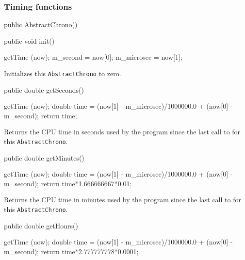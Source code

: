 \subsubsection*{Timing functions}

\begin{code}
   public AbstractChrono()\begin{hide} {
   }\end{hide}


   public void init() \begin{hide} {
      getTime (now);
      m_second = now[0];
      m_microsec = now[1];
   }\end{hide}
\end{code}
  \begin{tabb}  Initializes this \texttt{AbstractChrono} to zero.
  \end{tabb}
\begin{code}

   public double getSeconds()\begin{hide} {
      getTime (now);
      double time = (now[1] - m_microsec)/1000000.0
             + (now[0] - m_second);
      return time;
   }\end{hide}
\end{code}
 \begin{tabb}
  Returns the CPU time in seconds used by the program since the last call to
   for this \texttt{AbstractChrono}.
 \end{tabb}
\begin{htmlonly}
\end{htmlonly}
\begin{code}

   public double getMinutes()\begin{hide} {
      getTime (now);
      double time = (now[1] - m_microsec)/1000000.0
             + (now[0] - m_second);
      return time*1.666666667*0.01;
   }\end{hide}
\end{code}
 \begin{tabb}
  Returns the CPU time in minutes used by the program since the last call to
   for this \texttt{AbstractChrono}.
 \end{tabb}
\begin{htmlonly}
\end{htmlonly}
\begin{code}

   public double getHours()\begin{hide} {
      getTime (now);
      double time = (now[1] - m_microsec)/1000000.0
             + (now[0] - m_second);
      return time*2.777777778*0.0001;
   }\end{hide}
\end{code}
